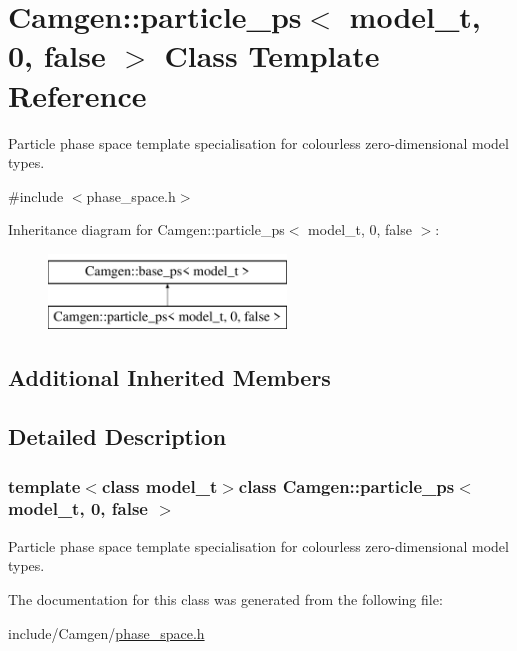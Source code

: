 \hypertarget{a00401}{\section{Camgen\-:\-:particle\-\_\-ps$<$ model\-\_\-t, 0, false $>$ Class Template Reference}
\label{a00401}
}


Particle phase space template specialisation for colourless zero-\/dimensional model types.  




{\ttfamily \#include $<$phase\-\_\-space.\-h$>$}

Inheritance diagram for Camgen\-:\-:particle\-\_\-ps$<$ model\-\_\-t, 0, false $>$\-:\begin{figure}[H]
\begin{center}
\leavevmode
\includegraphics[height=2.000000cm]{a00401}
\end{center}
\end{figure}
\subsection*{Additional Inherited Members}


\subsection{Detailed Description}
\subsubsection*{template$<$class model\-\_\-t$>$class Camgen\-::particle\-\_\-ps$<$ model\-\_\-t, 0, false $>$}

Particle phase space template specialisation for colourless zero-\/dimensional model types. 

The documentation for this class was generated from the following file\-:\begin{DoxyCompactItemize}
\item 
include/\-Camgen/\hyperlink{a00694}{phase\-\_\-space.\-h}\end{DoxyCompactItemize}
